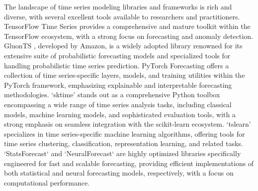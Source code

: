 \documentclass{article}
\begin{document}
The landscape of time series modeling libraries and frameworks is rich and diverse, with several excellent tools available to researchers and practitioners. TensorFlow Time Series \citep{abadi2016tensorflow} provides a comprehensive and mature toolkit within the TensorFlow ecosystem, with a strong focus on forecasting and anomaly detection.  GluonTS \citep{alexandrov2020gluonts}, developed by Amazon, is a widely adopted library renowned for its extensive suite of probabilistic forecasting models and specialized tools for handling probabilistic time series prediction.  PyTorch Forecasting \citep{paszke2019pytorch} offers a collection of time series-specific layers, models, and training utilities within the PyTorch framework, emphasizing explainable and interpretable forecasting methodologies.  `sktime' \citep{loning2019sktime} stands out as a comprehensive Python toolbox encompassing a wide range of time series analysis tasks, including classical models, machine learning models, and sophisticated evaluation tools, with a strong emphasis on seamless integration with the scikit-learn ecosystem.  `tslearn' \citep{tavenard2020tslearn} specializes in time series-specific machine learning algorithms, offering tools for time series clustering, classification, representation learning, and related tasks.  `StatsForecast` \citep{garza2022statsforecast} and `NeuralForecast` \citep{olivares2022library_neuralforecast} are highly optimized libraries specifically engineered for fast and scalable forecasting, providing efficient implementations of both statistical and neural forecasting models, respectively, with a focus on computational performance.
\end{document}
